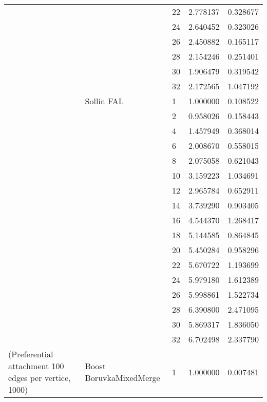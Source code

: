 \begin{tabular}{lllrr}
                      &            & 22 &  2.778137 &  0.328677 \\
                      &            & 24 &  2.640452 &  0.323026 \\
                      &            & 26 &  2.450882 &  0.165117 \\
                      &            & 28 &  2.154246 &  0.251401 \\
                      &            & 30 &  1.906479 &  0.319542 \\
                      &            & 32 &  2.172565 &  1.047192 \\
                      & Sollin FAL & 1  &  1.000000 &  0.108522 \\
                      &            & 2  &  0.958026 &  0.158443 \\
                      &            & 4  &  1.457949 &  0.368014 \\
                      &            & 6  &  2.008670 &  0.558015 \\
                      &            & 8  &  2.075058 &  0.621043 \\
                      &            & 10 &  3.159223 &  1.034691 \\
                      &            & 12 &  2.965784 &  0.652911 \\
                      &            & 14 &  3.739290 &  0.903405 \\
                      &            & 16 &  4.544370 &  1.268417 \\
                      &            & 18 &  5.144585 &  0.864845 \\
                      &            & 20 &  5.450284 &  0.958296 \\
                      &            & 22 &  5.670722 &  1.193699 \\
                      &            & 24 &  5.979180 &  1.612389 \\
                      &            & 26 &  5.998861 &  1.522734 \\
                      &            & 28 &  6.390800 &  2.471095 \\
                      &            & 30 &  5.869317 &  1.836050 \\
                      &            & 32 &  6.702498 &  2.337790 \\
(Preferential attachment 100 edges per vertice, 1000) & Boost BoruvkaMixedMerge & 1  &  1.000000 &  0.007481 \\

\end{tabular}
